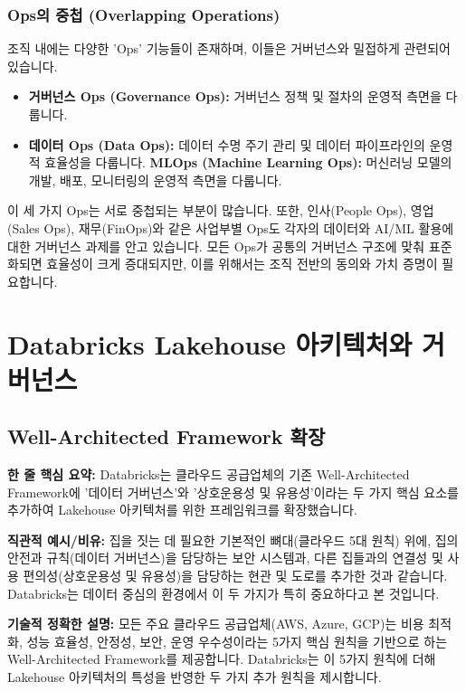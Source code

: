 \documentclass[11pt,a4paper]{article}
\theoremstyle{definition}
\begin{document}
\subsubsection*{Ops의 중첩 (Overlapping Operations)}
조직 내에는 다양한 'Ops' 기능들이 존재하며, 이들은 거버넌스와 밀접하게 관련되어 있습니다.
\begin{itemize}
    \item \textbf{거버넌스 Ops (Governance Ops):} 거버넌스 정책 및 절차의 운영적 측면을 다룹니다.
    \item \textbf{데이터 Ops (Data Ops):} 데이터 수명 주기 관리 및 데이터 파이프라인의 운영적 효율성을 다룹니다.
    \textbf{MLOps (Machine Learning Ops):} 머신러닝 모델의 개발, 배포, 모니터링의 운영적 측면을 다룹니다.
\end{itemize}
이 세 가지 Ops는 서로 중첩되는 부분이 많습니다. 또한, 인사(People Ops), 영업(Sales Ops), 재무(FinOps)와 같은 사업부별 Ops도 각자의 데이터와 AI/ML 활용에 대한 거버넌스 과제를 안고 있습니다. 모든 Ops가 공통의 거버넌스 구조에 맞춰 표준화되면 효율성이 크게 증대되지만, 이를 위해서는 조직 전반의 동의와 가치 증명이 필요합니다.

\newpage
\section*{Databricks Lakehouse 아키텍처와 거버넌스}

\subsection*{Well-Architected Framework 확장}

\begin{keyconceptbox}
\textbf{한 줄 핵심 요약:} Databricks는 클라우드 공급업체의 기존 Well-Architected Framework에 '데이터 거버넌스'와 '상호운용성 및 유용성'이라는 두 가지 핵심 요소를 추가하여 Lakehouse 아키텍처를 위한 프레임워크를 확장했습니다.
\end{keyconceptbox}

\textbf{직관적 예시/비유:}
집을 짓는 데 필요한 기본적인 뼈대(클라우드 5대 원칙) 위에, 집의 안전과 규칙(데이터 거버넌스)을 담당하는 보안 시스템과, 다른 집들과의 연결성 및 사용 편의성(상호운용성 및 유용성)을 담당하는 현관 및 도로를 추가한 것과 같습니다. Databricks는 데이터 중심의 환경에서 이 두 가지가 특히 중요하다고 본 것입니다.

\textbf{기술적 정확한 설명:}
모든 주요 클라우드 공급업체(AWS, Azure, GCP)는 비용 최적화, 성능 효율성, 안정성, 보안, 운영 우수성이라는 5가지 핵심 원칙을 기반으로 하는 Well-Architected Framework를 제공합니다. Databricks는 이 5가지 원칙에 더해 Lakehouse 아키텍처의 특성을 반영한 두 가지 추가 원칙을 제시합니다.
\end{document}
